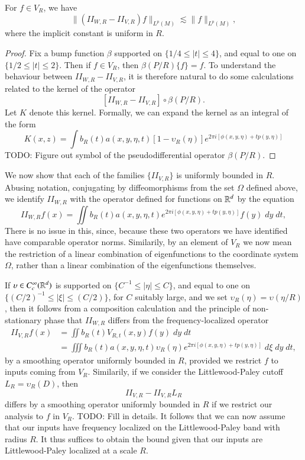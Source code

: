\begin{lemma}
    For $f \in V_R$, we have
    \[ \| (II_{W,R} - II_{V,R}) f \|_{L^p(M)} \lesssim \| f \|_{L^p(M)}, \]
    where the implicit constant is uniform in $R$.
\end{lemma}
\begin{proof}
    Fix a bump function $\beta$ supported on $\{ 1/4 \leq |t| \leq 4 \}$, and equal to one on $\{ 1/2 \leq |t| \leq 2 \}$. Then if $f \in V_R$, then $\beta(P/R) \{ f \} = f$. To understand the behaviour between $II_{W,R} - II_{V,R}$, it is therefore natural to do some calculations related to the kernel of the operator
    \[ [II_{W,R} - II_{V,R}] \circ \beta(P/R). \]
    Let $K$ denote this kernel. Formally, we can expand the kernel as an integral of the form
    \[ K(x,z) = \int b_R(t) a(x,y,\eta,t) [1 - \upsilon_R(\eta)] e^{2 \pi i [ \phi(x,y,\eta) + t p(y,\eta) ]} \]
    TODO: Figure out symbol of the pseudodifferential operator $\beta(P/R)$.
\end{proof}

We now show that each of the families $\{ II_{V,R} \}$ is uniformly bounded in $R$. Abusing notation, conjugating by diffeomorphisms from the set $\Omega$ defined above, we identify $II_{W,R}$ with the operator defined for functions on $\operatorname{\mathbb{R}}^d$ by the equation
%
\[ II_{W,R} f(x) = \iint b_R(t) a(x,y,\eta,t) e^{2 \pi i [\phi(x,y,\eta) + t p(y,\eta)]} f(y)\; dy\; dt, \]
%
There is no issue in this, since, because these two operators we have identified have comparable operator norms. Similarily, by an element of $V_R$ we now mean the restriction of a linear combination of eigenfunctions to the coordinate system $\Omega$, rather than a linear combination of the eigenfunctions themselves.

If $\upsilon \in C_c^\infty(\operatorname{\mathbb{R}}^d)$ is supported on $\{ C^{-1} \leq |\eta| \leq C \}$, and equal to one on $\{ (C/2)^{-1} \leq |\xi| \leq (C/2) \}$, for $C$ suitably large, and we set $\upsilon_R(\eta) = \upsilon ( \eta / R)$, then it follows from a composition calculation and the principle of non-stationary phase that $II_{W,R}$ differs from the frequency-localized operator
%
\begin{align*}
    II_{V,R} f(x) &= \iint b_R(t) V_{R,t}(x,y) f(y)\; dy\; dt\\
    &= \iiint b_R(t) a(x,y,\eta,t) \upsilon_R(\eta) e^{2 \pi i [\phi(x,y,\eta) + t p(y,\eta)]}\; d\xi\; dy\; dt,
\end{align*}
%
by a smoothing operator uniformly bounded in $R$, provided we restrict $f$ to inputs coming from $V_R$. Similarily, if we consider the Littlewood-Paley cutoff $L_R = \upsilon_R(D)$, then
%
\[ II_{V,R} - II_{V,R} L_R \]
%
differs by a smoothing operator uniformly bounded in $R$ if we restrict our analysis to $f$ in $V_R$. TODO: Fill in details. It follows that we can now assume that our inputs have frequency localized on the Littlewood-Paley band with radius $R$. It thus suffices to obtain the bound given that our inputs are Littlewood-Paley localized at a scale $R$.

